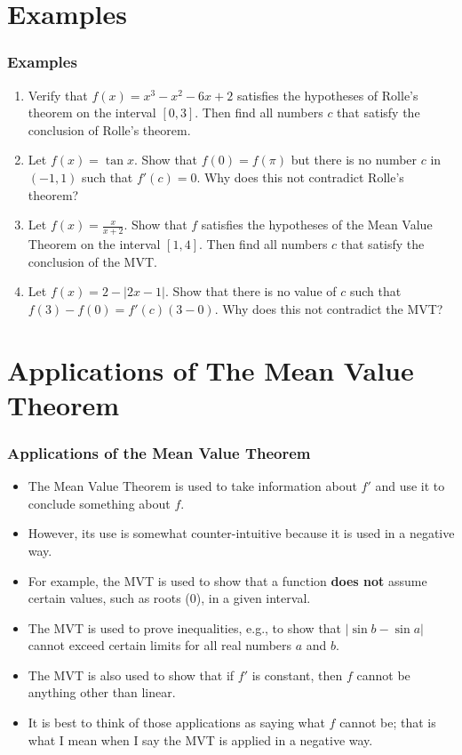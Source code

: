 \documentclass[serif,ignorenonframetext]{beamer}
\newcommand{\ds}{\displaystyle}
\begin{document}
\section{Examples}

\begin{frame}
  \frametitle{Examples}
  \begin{enumerate}
  \item Verify that $f(x)=x^3-x^2-6x+2$ satisfies the hypotheses of 
    Rolle's theorem on the interval $[0,3]$.  Then find all numbers $c$
    that satisfy the conclusion of Rolle's theorem.
  \item Let $f(x)=\tan x$.  Show that $f(0)=f(\pi)$ but there is no number
    $c$ in $(-1,1)$ such that $f'(c)=0$.  Why does this not contradict 
    Rolle's theorem?
  \item Let $\ds f(x)=\frac{x}{x+2}$.  Show that $f$ satisfies the hypotheses
    of the Mean Value Theorem on the interval $[1,4]$.  Then find all numbers
    $c$ that satisfy the conclusion of the MVT.
  \item Let $f(x)=2-|2x-1|$.  Show that there is no value of $c$ such that
    $f(3)-f(0)=f'(c)(3-0)$.  Why does this not contradict the MVT?
  \end{enumerate} 
\end{frame}

\section{Applications of The Mean Value Theorem}

\begin{frame}
  \frametitle{Applications of the Mean Value Theorem}
  \begin{itemize}[<+->]
  \item The Mean Value Theorem is used to take information about $f'$
    and use it to conclude something about $f$.
  \item However, its use is somewhat counter-intuitive because it is
    used in a negative way.
  \item For example, the MVT is used to show that a function \textbf{does not}
    assume certain values, such as roots ($0$), in a given interval.
  \item The MVT is used to prove inequalities, e.g.,
    to show that $|\sin b - \sin a|$
    cannot exceed certain limits for all real numbers $a$ and $b$.
  \item The MVT is also used to show that if $f'$ is constant, then $f$
    cannot be anything other than linear.
  \item It is best to think of those applications as saying what $f$ cannot
    be; that is what I mean when I say the MVT is applied in a negative way.
  \end{itemize}
\end{frame}
\end{document}
